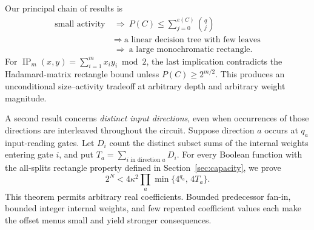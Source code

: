 \documentclass[11pt]{article}
\theoremstyle{definition}
\newcommand{\ip}{\operatorname{IP}}
\begin{document}
Our principal chain of results is
\[
 \begin{aligned}
 \text{small activity}
 &\ \Longrightarrow\ P(C)\le\sum_{j=0}^{e(C)}\binom qj\\
 &\ \Longrightarrow\ \text{a linear decision tree with few leaves}\\
 &\ \Longrightarrow\ \text{a large monochromatic rectangle}.
 \end{aligned}
\]
For \(\ip_m(x,y)=\sum_{i=1}^m x_i y_i\bmod2\), the last implication contradicts the Hadamard-matrix rectangle bound unless \(P(C)\ge2^{m/2}\). This produces an unconditional size--activity tradeoff at arbitrary depth and arbitrary weight magnitude.

A second result concerns \emph{distinct input directions}, even when occurrences of those directions are interleaved throughout the circuit. Suppose direction \(a\) occurs at \(q_a\) input-reading gates. Let \(D_i\) count the distinct subset sums of the internal weights entering gate \(i\), and put \(T_a=\sum_{i\text{ in direction }a}D_i\). For every Boolean function with the all-splits rectangle property defined in Section~\ref{sec:capacity}, we prove
\[
 2^N<4\kappa^2\prod_a\min\{4^{q_a},\,4T_a\}.                 \tag{1}
\]
This theorem permits arbitrary real coefficients. Bounded predecessor fan-in, bounded integer internal weights, and few repeated coefficient values each make the offset menus small and yield stronger consequences.
\end{document}
